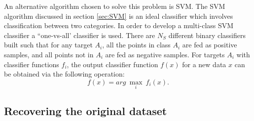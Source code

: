 \documentclass[letterpaper, 10 pt, conference]{ieeeconf}
\begin{document}
An alternative algorithm chosen to solve this problem is SVM. The SVM algorithm discussed in section \ref{sec:SVM} is an ideal classifier which involves classification between two categories. In order to develop a multi-class SVM classifier a ``one-vs-all' classifier is used. There are $N_S$ different binary classifiers built such that for any target $A_i$, all the points in class $A_i$ are fed as positive samples, and all points not in $A_i$ are fed as negative samples. For targets $A_i$ with classifier functions $f_i$, the output classifier function $f(x)$ for a new data $x$ can be obtained via the following operation:
\begin{equation}\label{eq:SVM-1}
f(x) = arg~ \max_i~f_i(x).
\end{equation}


\subsection{Recovering the original dataset}
\end{document}
